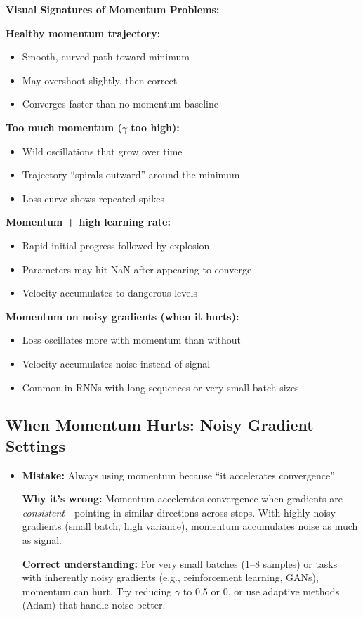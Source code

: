 \documentclass[../../main.tex]{subfiles}
\begin{document}
\begin{keyconcept}
\textbf{Visual Signatures of Momentum Problems:}

\textbf{Healthy momentum trajectory:}
\begin{itemize}
    \item Smooth, curved path toward minimum
    \item May overshoot slightly, then correct
    \item Converges faster than no-momentum baseline
\end{itemize}

\textbf{Too much momentum ($\gamma$ too high):}
\begin{itemize}
    \item Wild oscillations that grow over time
    \item Trajectory ``spirals outward'' around the minimum
    \item Loss curve shows repeated spikes
\end{itemize}

\textbf{Momentum + high learning rate:}
\begin{itemize}
    \item Rapid initial progress followed by explosion
    \item Parameters may hit NaN after appearing to converge
    \item Velocity accumulates to dangerous levels
\end{itemize}

\textbf{Momentum on noisy gradients (when it hurts):}
\begin{itemize}
    \item Loss oscillates more with momentum than without
    \item Velocity accumulates noise instead of signal
    \item Common in RNNs with long sequences or very small batch sizes
\end{itemize}
\end{keyconcept}

\subsection{When Momentum Hurts: Noisy Gradient Settings}

\begin{commonmistakes}
\begin{itemize}
    \item \textbf{Mistake:} Always using momentum because ``it accelerates convergence''

    \textbf{Why it's wrong:} Momentum accelerates convergence when gradients are \textit{consistent}---pointing in similar directions across steps. With highly noisy gradients (small batch, high variance), momentum accumulates noise as much as signal.

    \textbf{Correct understanding:} For very small batches (1--8 samples) or tasks with inherently noisy gradients (e.g., reinforcement learning, GANs), momentum can hurt. Try reducing $\gamma$ to 0.5 or 0, or use adaptive methods (Adam) that handle noise better.
\end{itemize}
\end{commonmistakes}
\end{document}
